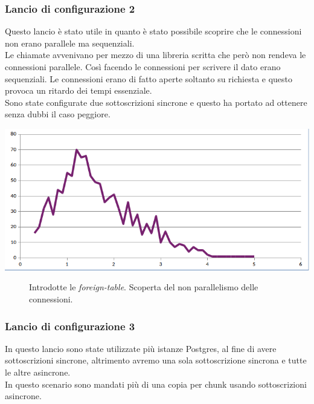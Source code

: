 \item
\subsubsection{Lancio di configurazione 2}
Questo lancio \`{e} stato utile in quanto \`{e} stato possibile scoprire che le connessioni non erano parallele ma sequenziali.\\
Le chiamate avvenivano per mezzo di una libreria scritta che per\`{o} non rendeva le connessioni parallele. Cos\`{i} facendo le connessioni per scrivere il dato erano sequenziali. Le connessioni erano di fatto aperte soltanto su richiesta e questo provoca un ritardo dei tempi essenziale.\\
Sono state configurate due sottoscrizioni sincrone e questo ha portato ad ottenere senza dubbi il caso peggiore.

\begin{center}
\includegraphics[scale=0.70]{img/round1b.png}
\end{center}
\begin{figure}[htbp]
\caption{Introdotte le \textit{foreign-table}. Scoperta del non parallelismo delle connessioni. \label{figura1.15}}
\end{figure}

\item
\subsubsection{Lancio di configurazione 3} 
In questo lancio sono state utilizzate pi\`{u} istanze Postgres, al fine di avere sottoscrizioni sincrone, altrimento avremo una sola sottoscrizione sincrona e tutte le altre asincrone.\\

In questo scenario sono mandati pi\`{u} di una copia per chunk usando sottoscrizioni asincrone.

